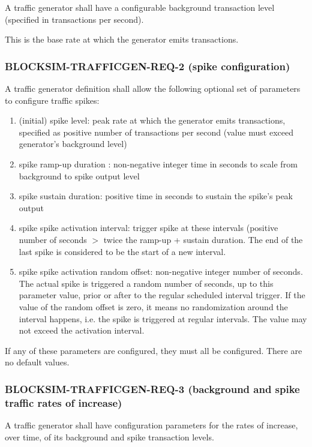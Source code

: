 \documentclass{scrreprt}
\begin{document}
A traffic generator shall have a configurable background transaction level
(specified in transactions per second).

This is the base rate at which the generator emits transactions.

\subsubsection{BLOCKSIM-TRAFFICGEN-REQ-2 (spike configuration)}

A traffic generator definition shall allow the following optional set of parameters to configure
traffic spikes:

\begin{enumerate}
   \item (initial) spike level: peak rate at which the generator emits transactions, specified as positive number of transactions per second (value must exceed generator's background level)
   \item spike ramp-up duration : non-negative integer time in seconds to scale from background to spike output level
   \item spike sustain duration: positive time in seconds to sustain the spike's peak output
   \item spike spike activation interval: trigger spike at these intervals (positive number of seconds $>$ twice the ramp-up + sustain duration. The end of the last spike is considered to be the start of a new interval.
   \item spike spike activation random offset: non-negative integer number of seconds. The actual spike is triggered a random number of seconds, up to this parameter value, prior or after to the regular scheduled interval trigger. If the value of the random offset is zero, it means no randomization around the interval happens, i.e. the spike is triggered at regular intervals. The value may not exceed the activation interval.
\end{enumerate}

If any of these parameters are configured, they must all be configured.
There are no default values.


\subsubsection{BLOCKSIM-TRAFFICGEN-REQ-3 (background and spike traffic rates of increase)}

A traffic generator shall have configuration parameters for the rates
of increase, over time, of its background and spike transaction levels.
\end{document}
